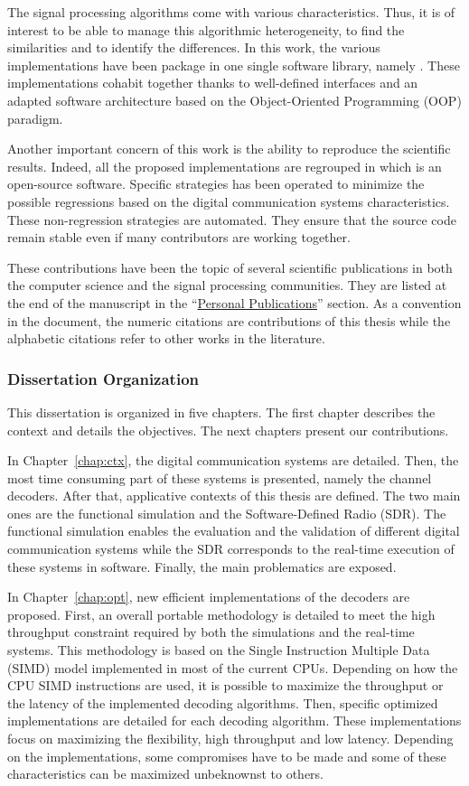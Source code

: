 The signal processing algorithms come with various characteristics. Thus, it is
of interest to be able to manage this algorithmic heterogeneity, to find the
similarities and to identify the differences. In this work, the various
implementations have been package in one single software library, namely
\AFFECT. These implementations cohabit together thanks to well-defined
interfaces and an adapted software architecture based on the Object-Oriented
Programming (OOP) paradigm.

Another important concern of this work is the ability to reproduce the
scientific results. Indeed, all the proposed implementations are regrouped in
\AFFECT which is an open-source software. Specific strategies has been operated
to minimize the possible regressions based on the digital communication systems
characteristics. These non-regression strategies are automated. They ensure that
the source code remain stable even if many contributors are working together.

These contributions have been the topic of several scientific publications in
both the computer science and the signal processing communities. They are listed
at the end of the manuscript in the
``\hyperref[chap:publi]{Personal Publications}'' section. As a convention in the
document, the numeric citations are contributions of this thesis while the
alphabetic citations refer to other works in the literature.

\subsubsection*{Dissertation Organization}

This dissertation is organized in five chapters. The first chapter describes the
context and details the objectives. The next chapters present our contributions.

In Chapter~\ref{chap:ctx}, the digital communication systems are detailed. Then,
the most time consuming part of these systems is presented, namely the channel
decoders. After that, applicative contexts of this thesis are defined. The two
main ones are the functional simulation and the Software-Defined Radio (SDR).
The functional simulation enables the evaluation and the validation of different
digital communication systems while the SDR corresponds to the real-time
execution of these systems in software. Finally, the main problematics are
exposed.

In Chapter~\ref{chap:opt}, new efficient implementations of the decoders are
proposed. First, an overall portable methodology is detailed to meet the high
throughput constraint required by both the simulations and the real-time
systems. This methodology is based on the Single Instruction Multiple Data
(SIMD) model implemented in most of the current CPUs. Depending on how the CPU
SIMD instructions are used, it is possible to maximize the throughput or the
latency of the implemented decoding algorithms. Then, specific optimized
implementations are detailed for each decoding algorithm. These implementations
focus on maximizing the flexibility, high throughput and low latency. Depending
on the implementations, some compromises have to be made and some of these
characteristics can be maximized unbeknownst to others.

